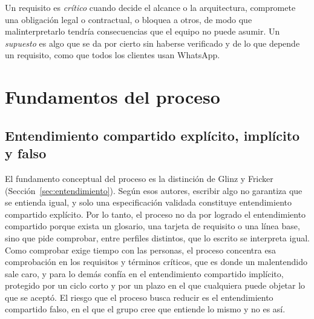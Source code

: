 \documentclass[12pt,letterpaper,oneside]{report}
\begin{document}
Un requisito es \emph{crítico} cuando decide el alcance o la arquitectura,
compromete una obligación legal o contractual, o bloquea a otros, de modo que
malinterpretarlo tendría consecuencias que el equipo no puede asumir. Un
\emph{supuesto} es algo que se da por cierto sin haberse verificado y de lo que
depende un requisito, como que todos los clientes usan WhatsApp.

\section{Fundamentos del proceso}
\label{sec:fundamentos}

\subsection{Entendimiento compartido explícito, implícito y falso}
\label{sec:ec_falso}
El fundamento conceptual del proceso es la distinción de Glinz y
Fricker~\cite{glinz2015shared} (Sección~\ref{sec:entendimiento}). Según esos
autores, escribir algo no garantiza que se entienda igual, y solo una
especificación validada constituye entendimiento compartido explícito. Por lo tanto, el proceso no da por logrado el entendimiento compartido porque exista un
glosario, una tarjeta de requisito o una línea base, sino que pide comprobar,
entre perfiles distintos, que lo escrito se interpreta igual. Como comprobar
exige tiempo con las personas, el proceso concentra esa comprobación en los
requisitos y términos críticos, que es donde un malentendido sale caro, y para lo demás confía en el
entendimiento compartido implícito, protegido por un ciclo corto y por un plazo en el que
cualquiera puede objetar lo que se aceptó. El riesgo que el proceso busca reducir es el entendimiento compartido falso, en el que el grupo cree que
entiende lo mismo y no es así.
\end{document}
